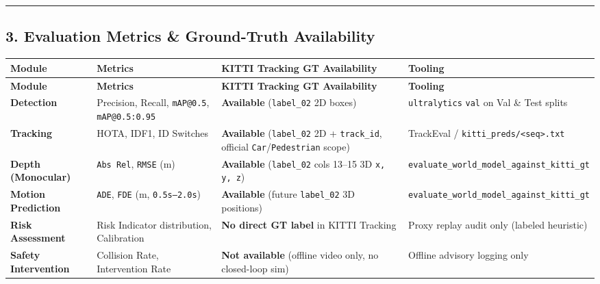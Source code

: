 \documentclass[10.5pt,a4paper]{article}
\begin{document}
\par\noindent\rule{\textwidth}{0.4pt}\par\medskip

\subsection{3. Evaluation Metrics \& Ground-Truth Availability}


\begin{footnotesize}
\setlength{\tabcolsep}{4pt}
\setlength{\LTleft}{0pt}\setlength{\LTright}{0pt}
\begin{longtable}{>{\raggedright\arraybackslash}p{} >{\raggedright\arraybackslash}p{} >{\raggedright\arraybackslash}p{} >{\raggedright\arraybackslash}p{}}
\toprule
\textbf{Module} & \textbf{Metrics} & \textbf{KITTI Tracking GT Availability} & \textbf{Tooling} \\
\midrule
\endfirsthead
\toprule
\textbf{Module} & \textbf{Metrics} & \textbf{KITTI Tracking GT Availability} & \textbf{Tooling} \\
\midrule
\endhead
\bottomrule
\endfoot
\textbf{Detection} & Precision, Recall, \texttt{mAP@0.\allowbreak{}5}, \texttt{mAP@0.\allowbreak{}5:\allowbreak{}0.\allowbreak{}95} & \textbf{Available} (\texttt{label\_\allowbreak{}02} 2D boxes) & \texttt{ultralytics} \texttt{val} on Val \& Test splits \\
\textbf{Tracking} & HOTA, IDF1, ID Switches & \textbf{Available} (\texttt{label\_\allowbreak{}02} 2D + \texttt{track\_\allowbreak{}id}, official \texttt{Car}/\texttt{Pedestrian} scope) & TrackEval / \texttt{kitti\_\allowbreak{}preds/\allowbreak{}<seq>.\allowbreak{}txt} \\
\textbf{Depth (Monocular)} & \texttt{Abs Rel}, \texttt{RMSE} (m) & \textbf{Available} (\texttt{label\_\allowbreak{}02} cols 13--15 3D \texttt{x,\allowbreak{} y,\allowbreak{} z}) & \texttt{evaluate\_\allowbreak{}world\_\allowbreak{}model\_\allowbreak{}against\_\allowbreak{}kitti\_\allowbreak{}gt} \\
\textbf{Motion Prediction} & \texttt{ADE}, \texttt{FDE} (m, \texttt{0.\allowbreak{}5s--2.\allowbreak{}0s}) & \textbf{Available} (future \texttt{label\_\allowbreak{}02} 3D positions) & \texttt{evaluate\_\allowbreak{}world\_\allowbreak{}model\_\allowbreak{}against\_\allowbreak{}kitti\_\allowbreak{}gt} \\
\textbf{Risk Assessment} & Risk Indicator distribution, Calibration & \textbf{No direct GT label} in KITTI Tracking & Proxy replay audit only (labeled heuristic) \\
\textbf{Safety Intervention} & Collision Rate, Intervention Rate & \textbf{Not available} (offline video only, no closed-loop sim) & Offline advisory logging only \\
\end{longtable}
\end{footnotesize}
\end{document}
